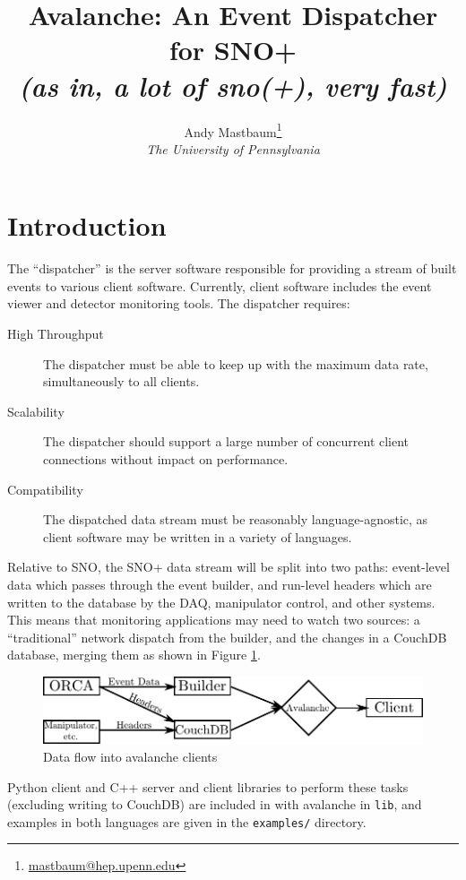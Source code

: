 \documentclass{article}
\title{Avalanche: An Event Dispatcher for SNO+\\{\it \small (as in, a lot of sno(+), very fast)}}
\author{Andy Mastbaum\footnote{\href{mailto:mastbaum@hep.upenn.edu}{mastbaum@hep.upenn.edu}}\\\small{\it The University of Pennsylvania}}
\begin{document}
\maketitle
\tableofcontents
\section{Introduction}
The ``dispatcher'' is the server software responsible for providing a stream of built events to various client software. Currently, client software includes the event viewer and detector monitoring tools. The dispatcher requires:

\begin{description}
\item[High Throughput] The dispatcher must be able to keep up with the maximum data rate, simultaneously to all clients.
\item[Scalability] The dispatcher should support a large number of concurrent client connections without impact on performance.
\item[Compatibility] The dispatched data stream must be reasonably language-agnostic, as client software may be written in a variety of languages.
\end{description}

Relative to SNO, the SNO+ data stream will be split into two paths: event-level data which passes through the event builder, and run-level headers which are written to the database by the DAQ, manipulator control, and other systems. This means that monitoring applications may need to watch two sources: a ``traditional'' network dispatch from the builder, and the changes in a CouchDB database, merging them as shown in Figure \ref{avalanche_stream}.
\begin{figure}
\begin{centering}
\includegraphics[scale=0.75]{figures/flow.pdf}
\caption{Data flow into avalanche clients}
\label{avalanche_stream}
\end{centering}
\end{figure}

Python client and C++ server and client libraries to perform these tasks (excluding writing to CouchDB) are included in with avalanche in {\tt lib}, and examples in both languages are given in the {\tt examples/} directory.
\end{document}
